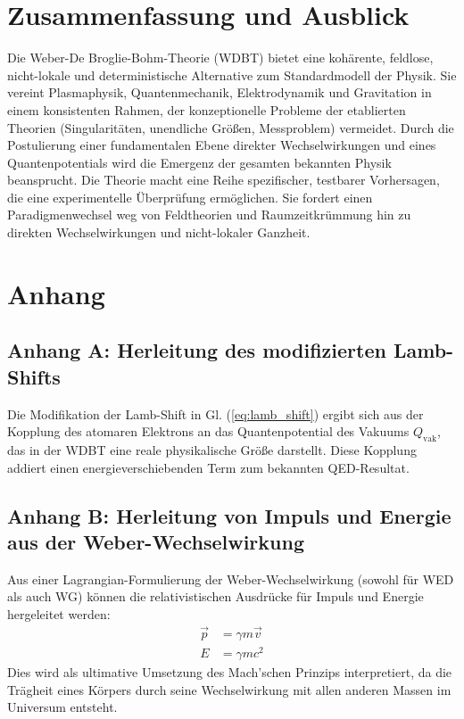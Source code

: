 \documentclass[11pt, a4paper]{article}
\begin{document}
\section{Zusammenfassung und Ausblick}
\label{sec:zusammenfassung}

Die Weber-De Broglie-Bohm-Theorie (WDBT) bietet eine kohärente, feldlose, nicht-lokale und deterministische Alternative zum Standardmodell der Physik. Sie vereint Plasmaphysik, Quantenmechanik, Elektrodynamik und Gravitation in einem konsistenten Rahmen, der konzeptionelle Probleme der etablierten Theorien (Singularitäten, unendliche Größen, Messproblem) vermeidet. Durch die Postulierung einer fundamentalen Ebene direkter Wechselwirkungen und eines Quantenpotentials wird die Emergenz der gesamten bekannten Physik beansprucht. Die Theorie macht eine Reihe spezifischer, testbarer Vorhersagen, die eine experimentelle Überprüfung ermöglichen. Sie fordert einen Paradigmenwechsel weg von Feldtheorien und Raumzeitkrümmung hin zu direkten Wechselwirkungen und nicht-lokaler Ganzheit.

\appendix
\section*{Anhang}

\subsection*{Anhang A: Herleitung des modifizierten Lamb-Shifts}
\label{anh:a}

Die Modifikation der Lamb-Shift in Gl. (\ref{eq:lamb_shift}) ergibt sich aus der Kopplung des atomaren Elektrons an das Quantenpotential des Vakuums $Q_{\text{vak}}$, das in der WDBT eine reale physikalische Größe darstellt. Diese Kopplung addiert einen energieverschiebenden Term zum bekannten QED-Resultat.

\subsection*{Anhang B: Herleitung von Impuls und Energie aus der Weber-Wechselwirkung}
\label{anh:b}

Aus einer Lagrangian-Formulierung der Weber-Wechselwirkung (sowohl für WED als auch WG) können die relativistischen Ausdrücke für Impuls und Energie hergeleitet werden:
\begin{align*}
\vec{p} &= \gamma m \vec{v} \\
E &= \gamma m c^2
\end{align*}
Dies wird als ultimative Umsetzung des Mach'schen Prinzips interpretiert, da die Trägheit eines Körpers durch seine Wechselwirkung mit allen anderen Massen im Universum entsteht.
\end{document}

